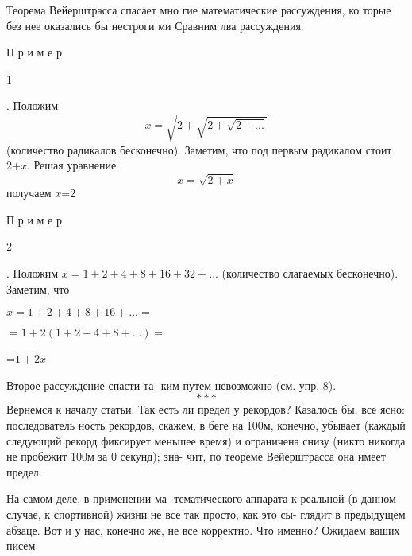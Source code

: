 \begin{minipage}{.34 \textwidth}
    \setlength{\parindent}{2em}
    \hspace{0.5cm}Теорема Вейерштрасса спасает мно
    гие математические рассуждения, ко
    торые без нее оказались бы нестроги
    ми Сравним лва рассуждения.
    
    \hspace{0.5cm}\begin{large} П р и м е р \end{large}  \begin{Large} 1\end{Large}. Положим
    \begin{equation}
        x = \sqrt{2+\sqrt{2+\sqrt{2+ ...}}}
    \end{equation}
    (количество радикалов бесконечно).
    Заметим, что под первым радикалом стоит 2+$x$. Решая уравнение
    \begin{equation}
        x = \sqrt{2+x}
    \end{equation}
    получаем $x$=2
    
    \hspace{0.5cm}\begin{large} П р и м е р \end{large}  \begin{Large} 2\end{Large}. Положим
    \(x = 1 + 2 + 4 + 8 + 16 + 32 + ...\)
    (количество слагаемых бесконечно).
    Заметим, что
    
    \hspace{0.5cm}\(x = 1 + 2 + 4 + 8 + 16 + ... = \)
    
    \hspace{0.5cm}\( = 1 + 2(1 + 2 + 4 + 8 + ...) = \)
    
    \hspace{4.2cm}=\(1 + 2x\)
\end{minipage}
\begin{minipage}{.34\textwidth}
    \hspace{0.5cm}Второе рассуждение спасти та-
    ким путем невозможно (см. упр. 8).
    \[***\]
    \hspace{0.5cm}Вернемся к началу статьи. Так
    есть ли предел у рекордов? Казалось
    бы, все ясно: последователь ность
    рекордов, скажем, в беге на 100м,
    конечно, убывает (каждый следующий
    рекорд фиксирует меньшее время)
    и ограничена снизу (никто никогда
    не пробежит 100м за 0 секунд); зна-
    чит, по теореме Вейерштрасса она
    имеет предел.
    
    \hspace{0.5cm}На самом деле, в применении ма-
    тематического аппарата к реальной
    (в данном случае, к спортивной)
    жизни не все так просто, как это сы-
    глядит в предыдущем абзаце. Вот и
    у нас, конечно же, не все корректно.
    Что именно? Ожидаем ваших писем.
    \\
\end{minipage}